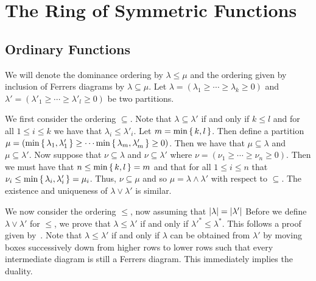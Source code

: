 \documentclass[letterpaper, 11pt, oneside]{book}
\begin{document}
\clearpage

\chapter{\cite{book:ManivelSFSPDL} The Ring of Symmetric Functions}

\section{Ordinary Functions}

\begin{sol}\label{ex:Manivel_1.1.2}
  We will denote the dominance ordering by $\lambda \leq \mu$ and the ordering given by inclusion of Ferrers diagrams by $\lambda \subseteq \mu$.
  Let $\lambda = (\lambda_{1} \geq \cdots \geq \lambda_{k} \geq 0)$ and $\lambda' = (\lambda'_{1} \geq \cdots \geq \lambda'_{l} \geq 0)$ be two partitions.

  We first consider the ordering $\subseteq$.
  Note that $\lambda \subseteq \lambda'$ if and only if $k \leq l$ and for all $1 \leq i \leq k$ we have that $\lambda_{i} \leq \lambda'_{i}$.
  Let $m = \min\set{k, l}$.
  Then define a partition $\mu = (\min\set{\lambda_{1}, \lambda'_{1}} \geq \cdots \min\set{\lambda_{m}, \lambda'_{m}} \geq 0)$.
  Then we have that $\mu \subseteq \lambda$ and $\mu \subseteq \lambda'$.
  Now suppose that $\nu \subseteq \lambda$ and $\nu \subseteq \lambda'$ where $\nu = (\nu_{1} \geq \cdots \geq \nu_{n} \geq 0)$.
  Then we must have that $n \leq \min\set{k, l} = m$ and that for all $1 \leq i \leq n$ that $\nu_{i} \leq \min\set{\lambda_{i}, \lambda'_{i}} = \mu_{i}$.
  Thus, $\nu \subseteq \mu$ and so $\mu = \lambda \land \lambda'$ with respect to $\subseteq$.
  The existence and uniqueness of $\lambda \lor \lambda'$ is similar.

  We now consider the ordering $\leq$, now assuming that $\abs{\lambda} = \abs{\lambda'}$
  Before we define $\lambda \lor \lambda'$ for $\leq$, we prove that $\lambda \leq \lambda'$ if and only if ${\lambda'}^{*} \leq \lambda^{*}$.
  This follows a proof given by~\cite{SE:dominance_conjugation}.
  Note that $\lambda \leq \lambda'$ if and only if $\lambda$ can be obtained from $\lambda'$ by moving boxes successively down from higher rows to lower rows such that every intermediate diagram is still a Ferrers diagram.
  This immediately implies the duality.


\end{sol}
\end{document}
